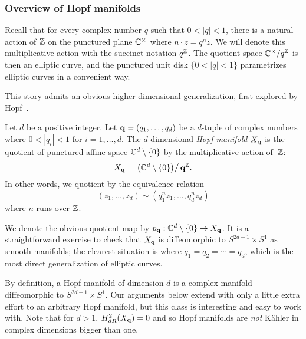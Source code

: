 
\subsubsection{Overview of Hopf manifolds}

Recall that for every complex number $q$ such that $0< |q| < 1$, 
there is a natural action of $\mathbb Z$ on the punctured plane $\mathbb C^\times$ where $n \cdot z = q^n z$.
We will denote this multiplicative action with the succinct notation $q^\mathbb Z$.
The quotient space $\mathbb C^\times/q^\mathbb Z$ is then an elliptic curve,
and the punctured unit disk $\{0< |q|<1\}$ parametrizes elliptic curves in a convenient way.

This story admits an obvious higher dimensional generalization, first explored by Hopf~\cite{Hopf}.

\begin{dfn}
Let $d$ be a positive integer.
Let ${\bf q} = (q_1,\ldots, q_d)$ be a $d$-tuple of complex numbers where $0 < |q_i| < 1$ for $i = 1, \ldots, d$. 
The $d$-dimensional {\em Hopf manifold} $X_{\bf q}$ is the quotient of punctured affine space $\mathbb C^d \setminus \{0\}$ by the multiplicative action of~$\mathbb Z$:
\[
X_{\bf q} = \left. \left(\mathbb C^d \setminus \{0\}\right) \right/ {\bf q}^\mathbb Z.  
\]
In other words, we quotient by the equivalence relation
\[
(z_1,\ldots,z_d) \sim (q_1^{n} z_1, \ldots,q_d^{n} z_d)
\]
where $n$ runs over $\mathbb Z$.
\end{dfn}


We denote the obvious quotient map by $p_{\bf q} : \mathbb C^d \setminus \{0\} \to X_{\bf q}$. 
It is a straightforward exercise to check that $X_{\bf q}$ is diffeomorphic to $S^{2d-1} \times S^1$ as smooth manifolds;
the clearest situation is where $q_1 = q_2 = \cdots = q_d$,
which is the most direct generalization of elliptic curves.

\begin{rmk}
By definition, a Hopf manifold of dimension $d$ is a complex manifold diffeomorphic to $S^{2d-1} \times S^1$. 
Our arguments below extend with only a little extra effort to an arbitrary Hopf manifold, 
but this class is interesting and easy to work with.
Note that for $d>1$, $H^{2}_{dR} (X_{\bf q}) = 0$ and so Hopf manifolds are {\em not} K\"{a}hler in complex dimensions bigger than one. 
\end{rmk}

